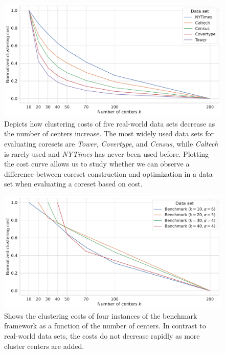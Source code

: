 \begin{figure}
  \caption{Depicts how clustering costs of five real-world data sets decrease as the number of centers increase. 
  The most widely used data sets for evaluating coresets are \textit{Tower}, \textit{Covertype}, and \textit{Census}, while \textit{Caltech} is rarely used and \textit{NYTimes} has never been used before.
  Plotting the cost curve allows us to study whether we can observe a difference between coreset construction and optimization in a data set when evaluating a coreset based on cost.
  }
  \label{fig:cost-curves-real-world-datasets}
  \includegraphics[width=1\linewidth]{figures/cost-curves-real-world-datasets.pdf}
\end{figure}


\begin{figure}
  \caption{Shows the clustering costs of four instances of the benchmark framework as a function of the number of centers. In contrast to real-world data sets, the costs do not decrease rapidly as more cluster centers are added.
  }
  \label{fig:cost-curves-benchmark}
  \includegraphics[width=1\linewidth]{figures/cost-curves-benchmark.pdf}
\end{figure}


